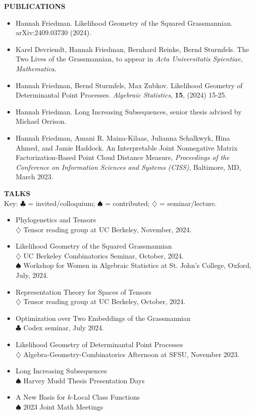 \documentclass[11pt]{article}
\newcommand{\hdr}[1]{\textcolor{blue(ryb)}{\textbf{#1}}}
\begin{document}
\bigskip

\hdr{PUBLICATIONS}\\
\begin{itemize}
\item Hannah Friedman.
  Likelihood Geometry of the Squared Grassmannian. arXiv:2409.03730 (2024).
  \item Karel Devriendt, Hannah Friedman, Bernhard Reinke, Bernd Sturmfels.
    The Two Lives of the Grassmannian, to appear in \textit{Acta Universitatis Spientiae, Mathematica}. 
\item Hannah Friedman, Bernd Sturmfels, Max Zubkov.
  Likelihood Geometry of Determinantal Point Processes.
  \emph{Algebraic Statistics}, \textbf{15}, (2024) 15-25.
\item Hannah Friedman. Long Increasing Subsequences, senior thesis advised by Michael Orrison. 
\item Hannah Friedman, Amani R. Maina-Kilaas, Julianna Schalkwyk, Hina Ahmed, and Jamie Haddock. 
  An Interpretable Joint Nonnegative Matrix Factorization-Based Point Cloud Distance Measure, \emph{Proceedings of the Conference on Information Sciences and Systems (CISS)}, Baltimore, MD, March 2023.
\end{itemize}

\bigskip

\hdr{TALKS}\\
Key: $\clubsuit$ = invited/colloquium; $\spadesuit$ = contributed; $\diamondsuit$ = seminar/lecture.
\begin{itemize}
\item Phylogenetics and Tensors\\
  $\diamondsuit$ Tensor reading group at UC Berkeley, November, 2024. 
\item Likelihood Geometry of the Squared Grassmannian\\
  $\diamondsuit$ UC Berkeley Combinatorics Seminar, October, 2024.\\
  $\spadesuit$ Workshop for Women in Algebraic Statistics at St. John's College, Oxford, July, 2024. 
\item Representation Theory for Spaces of Tensors\\
  $\diamondsuit$ Tensor reading group at UC Berkeley, October, 2024. 
\item Optimization over Two Embeddings of the Grassmannian\\
  $\clubsuit$ Codex seminar, July 2024. 
\item Likelihood Geometry of Determinantal Point Processes\\
  $\diamondsuit$ Algebra-Geometry-Combinatorics Afternoon at SFSU, November 2023.
\item Long Increasing Subsequences\\
  $\spadesuit$ Harvey Mudd Thesis Presentation Days
\item A New Basis for $k$-Local Class Functions\\
  $\spadesuit$ 2023 Joint Math Meetings
\end{itemize}
\end{document}
